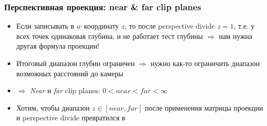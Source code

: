 \documentclass[10pt]{beamer}
\begin{document}
\begin{frame}[fragile]
\frametitle{Перспективная проекция: near \& far clip planes}
\begin{itemize}
\item Если записывать в \(w\) координату \(z\), то после perspective divide \(z = 1\), т.е. у всех точек одинаковая глубина, и не работает тест глубины \begin{math}\Longrightarrow\end{math} нам нужна другая формула проекции!
\pause
\item Итоговый диапазон глубин ограничен \begin{math}\Longrightarrow\end{math} нужно как-то ограничить диапазон возможных расстояний до камеры
\pause
\item \(\Longrightarrow\) \textit{Near} и \textit{far} clip planes: \begin{math}0 < near < far < \infty\end{math}
\pause
\item Хотим, чтобы диапазон \begin{math}z\in [near,far]\end{math} после применения матрицы проекции и perspective divide превратился в \begin{math}[0,1]\end{math}
\end{itemize}
\end{frame}
\end{document}

